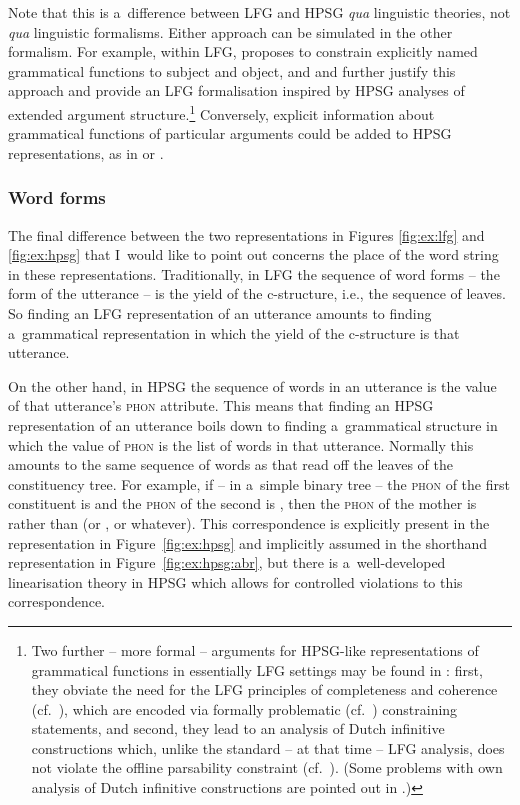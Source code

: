 \documentclass[output=paper,hidelinks]{langscibook}
\begin{document}
Note that this is a~difference between LFG and HPSG \emph{qua} linguistic theories, not \emph{qua} linguistic formalisms.  Either approach can be simulated in the other formalism.  For example, within LFG, \citet{alsina1996the-role} proposes to constrain explicitly named grammatical functions to subject and object, and \citet{patejuk2016reducing} and \citet{Przep16} further justify this approach and provide an LFG formalisation inspired by HPSG analyses of extended argument structure\@.\footnote{Two further -- more formal -- arguments for HPSG-like representations of grammatical functions in essentially LFG settings may be found in \citet[Chapter {4}]{john:88:book}: first, they obviate the need for the LFG principles of completeness and coherence (cf.~), which are encoded via formally problematic (cf.~) constraining statements, and second, they lead to an analysis of Dutch infinitive constructions which, unlike the standard -- at that time -- LFG analysis, does not violate the offline parsability constraint (cf.~). (Some problems with  own analysis of Dutch infinitive constructions are pointed out in \citealt{zaenen-kaplan1995}.)}  Conversely, explicit information about grammatical functions of particular arguments could be added to HPSG representations, as in \citet{ack:web:98} or \citet{hell:19}.

\subsubsection{Word forms}
\label{sec:arch:string}

The final difference between the two representations in Figures \ref{fig:ex:lfg} and \ref{fig:ex:hpsg} that I~would like to point out concerns the place of the word string in these representations.  Traditionally, in LFG the sequence of word forms -- the form of the utterance -- is the yield of the c-structure, i.e., the sequence of leaves. So finding an LFG representation of an utterance amounts to finding a~grammatical representation in which the yield of the c-structure is that utterance.  

On the other hand, in HPSG the sequence of words in an utterance is the value of that utterance's \textsc{phon} attribute. This means that finding an HPSG representation of an utterance boils down to finding a~grammatical structure in which the value of \textsc{phon} is the list of words in that utterance.  Normally this amounts to the same sequence of words as that read off the leaves of the constituency tree.  For example, if -- in a~simple binary tree -- the \textsc{phon} of the first constituent is  and the \textsc{phon} of the second is , then the \textsc{phon} of the mother is  rather than  (or , or whatever).  This correspondence is explicitly present in the representation in Figure~\ref{fig:ex:hpsg} and implicitly assumed in the shorthand representation in Figure~\ref{fig:ex:hpsg:abr}, but there is a~well-developed linearisation theory in HPSG which allows for controlled violations to this correspondence. 
\end{document}
